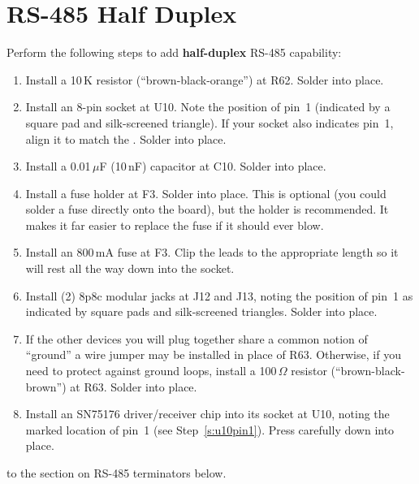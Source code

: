 \documentclass[letterpaper,twoside,onecolumn,openright,final]{memoir}
\begin{document}
\section{RS-485 Half Duplex}
Perform the following steps to add {\bfseries half-duplex} RS-485 capability:
\begin{enumerate}
\item	Install a 10\,K resistor (``brown-black-orange'') at R62.  Solder into place.
\item\label{s:u10pin1}
	Install an 8-pin  socket at U10.  Note the position of pin~1 (indicated
	by a square pad and silk-screened triangle).  If your socket also indicates pin~1, align
	it to match the . Solder into place.
\item	Install a 0.01\,$\mu$F (10\,nF) capacitor at C10. Solder into place.
\item	Install a fuse holder at F3.  Solder into place.  This is optional (you could solder a fuse
	directly onto the board), but the holder is recommended.  It makes it far easier to replace
	the fuse if it should ever blow.
\item	Install an 800\,mA fuse at F3.  Clip the leads to the appropriate length so it will rest
	all the way down into the socket.
\item	Install (2) 8p8c modular jacks at J12 and J13, noting the position of pin~1 as indicated by
	square pads and silk-screened triangles.  Solder into place.
\item	If the other devices you will plug together share a common notion of ``ground'' a wire jumper
	may be installed in place of R63.  Otherwise, if you need to protect against ground loops,
	install a 100\,$\Omega$ resistor (``brown-black-brown'') at R63. Solder into place.
\item	Install an SN75176 driver/receiver chip into its socket at U10, noting the marked location
	of pin~1 (see Step~\ref{s:u10pin1}).  Press carefully down into place.
\end{enumerate}

\bigskip{} to the section on RS-485 terminators below.
\end{document}
